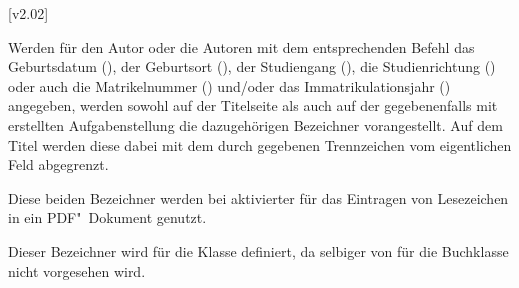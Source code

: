 \begin{DeclareEntity*}{}
\begin{DeclareEntity*}{}
\begin{DeclareEntity*}{}
\begin{Declaration}
  {}
\begin{Declaration}
  {}
\begin{Declaration}
  {}
\begin{Declaration}
  {}
\begin{Declaration}
  {}
\begin{Declaration}
  {}
  [v2.02]

Werden für den Autor oder die Autoren mit dem entsprechenden Befehl das 
Geburtsdatum (), der Geburtsort (), der 
Studiengang (), die Studienrichtung () oder 
auch die Matrikelnummer () und/oder das 
Immatrikulationsjahr () angegeben, werden sowohl auf 
der Titelseite als auch auf der gegebenenfalls mit  
erstellten Aufgabenstellung die dazugehörigen Bezeichner vorangestellt. Auf 
dem Titel werden diese dabei mit dem durch  gegebenen 
Trennzeichen vom eigentlichen Feld abgegrenzt.
\end{Declaration}
\end{Declaration}
\end{Declaration}
\end{Declaration}
\end{Declaration}
\end{Declaration}

\begin{Declaration}
  {}
\begin{Declaration}
  {}
\printdeclarationlist[Lesezeichen]

Diese beiden Bezeichner werden bei aktivierter  für das 
Eintragen von Lesezeichen in ein PDF"~Dokument genutzt.
\end{Declaration}
\end{Declaration}

\begin{Declaration}
  {}
\printdeclarationlist[Zusammenfassung]

Dieser Bezeichner wird für die Klasse  definiert, da selbiger 
von \KOMAScript für die Buchklasse nicht vorgesehen wird.
\end{Declaration}


\end{DeclareEntity*}
\end{DeclareEntity*}
\end{DeclareEntity*}
